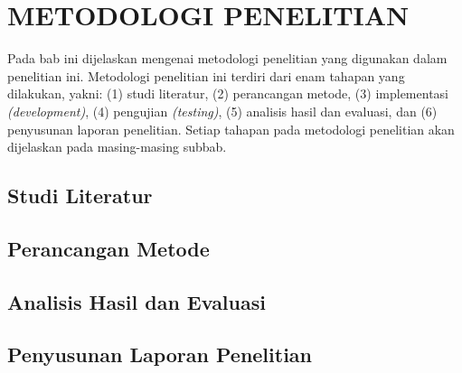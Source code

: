 %
%
%
%
%

\chapter{METODOLOGI PENELITIAN}
\label{sec:metodologi-penelitian}

Pada bab ini dijelaskan mengenai metodologi penelitian yang digunakan dalam penelitian ini. Metodologi penelitian ini terdiri dari enam tahapan yang dilakukan, yakni: (1) studi literatur, (2) perancangan metode, (3) implementasi \textit{(development)}, (4) pengujian \textit{(testing)}, (5) analisis hasil dan evaluasi, dan (6) penyusunan laporan penelitian. Setiap tahapan pada metodologi penelitian akan dijelaskan pada masing-masing subbab.

\section{Studi Literatur}

\blindtext

\section{Perancangan Metode}

\blindtext

\section{Analisis Hasil dan Evaluasi}

\blindtext

\section{Penyusunan Laporan Penelitian}

\blindtext
